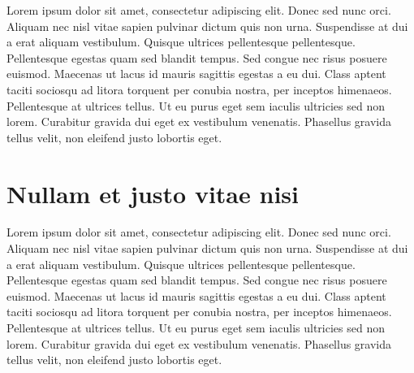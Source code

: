 Lorem ipsum dolor sit amet, consectetur adipiscing elit. Donec sed nunc orci. Aliquam nec nisl vitae sapien pulvinar dictum quis non urna. Suspendisse at dui a erat aliquam vestibulum. Quisque ultrices pellentesque pellentesque. Pellentesque egestas quam sed blandit tempus. Sed congue nec risus posuere euismod. Maecenas ut lacus id mauris sagittis egestas a eu dui. Class aptent taciti sociosqu ad litora torquent per conubia nostra, per inceptos himenaeos. Pellentesque at ultrices tellus. Ut eu purus eget sem iaculis ultricies sed non lorem. Curabitur gravida dui eget ex vestibulum venenatis. Phasellus gravida tellus velit, non eleifend justo lobortis eget.
\cite{ictbusiness}
\cite{donoho}

\section{Nullam et justo vitae nisi}
\label{sec:problem}

Lorem ipsum dolor sit amet, consectetur adipiscing elit. Donec sed nunc orci. Aliquam nec nisl vitae sapien pulvinar dictum quis non urna. Suspendisse at dui a erat aliquam vestibulum. Quisque ultrices pellentesque pellentesque. Pellentesque egestas quam sed blandit tempus. Sed congue nec risus posuere euismod. Maecenas ut lacus id mauris sagittis egestas a eu dui. Class aptent taciti sociosqu ad litora torquent per conubia nostra, per inceptos himenaeos. Pellentesque at ultrices tellus. Ut eu purus eget sem iaculis ultricies sed non lorem. Curabitur gravida dui eget ex vestibulum venenatis. Phasellus gravida tellus velit, non eleifend justo lobortis eget.


